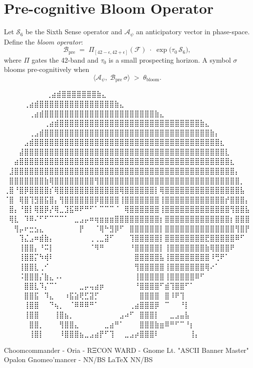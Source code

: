
\section*{Pre-cognitive Bloom Operator}

Let $\mathcal{S}_6$ be the Sixth Sense operator and $\mathcal{A}_\psi$ an anticipatory vector in phase-space.  
Define the \emph{bloom operator}:
\[
\mathcal{B}_{\mathrm{pre}} \;=\; \Pi_{[42-\epsilon,42+\epsilon]}(\mathcal{F})\;\cdot\;
\exp\!\bigl(\tau_0\,\mathcal{S}_6\bigr),
\]
where $\Pi$ gates the 42-band and $\tau_0$ is a small prospecting horizon.  
A symbol $\sigma$ blooms pre-cognitively when
\[
\langle \mathcal{A}_\psi,\;\mathcal{B}_{\mathrm{pre}}\,\sigma\rangle \;>\; \theta_{\mathrm{bloom}}.
\]

\iffalse
⠀⠀⠀⠀⠀⠀             ⠀⠀⢀⣴⣾⣿⣿⣿⣿⣿⣿⣿⣷⣄⠀⠀⠀⠀⠀⠀⠀⠀
⠀⠀⠀  ⠀      ⠀⠀⠀⠀⢀⣴⣾⣿⣿⣿⣿⣿⣿⣿⣿⣿⣿⣿⣿⣿⣿⣿⣷⣄⠀⠀⠀⠀⠀⠀⠀⠀
⠀⠀ ⠀   ⠀⠀⠀⠀⠀⢀⣴⣾⣿⣿⣿⣿⣿⣿⣿⣿⣿⣿⣿⣿⣿⣿⣿⣿⣿⣿⣿⣿⣿⣿⣷⣄⠀⠀⠀⠀⠀⠀⠀⠀
⠀⠀⠀⠀⠀⠀⠀⠀⢀⣴⣾⣿⣿⣿⣿⣿⣿⣿⣿⣿⣿⣿⣿⣿⣿⣿⣿⣿⣿⣿⣿⣿⣿⣿⣿⣿⣿⣿⣿⣷⣄⠀⠀⠀⠀⠀⠀⠀⠀
⠀⠀⠀⠀⠀⢀⣠⣾⣿⣿⣿⣿⣿⣿⣿⣿⣿⣿⣿⣿⣿⣿⣿⣿⣿⣿⣿⣿⣿⣿⣿⣿⣿⣿⣿⣿⣿⣿⣿⣿⣿⣷⡄⠀⠀⠀⠀⠀⠀
⠀⠀⠀⠀⣠⣾⣿⣿⣿⣿⣿⣿⣿⣿⣿⣿⣿⣿⣿⣿⣿⣿⣿⣿⣿⣿⣿⣿⣿⣿⣿⣿⣿⣿⣿⣿⣿⣿⣿⣿⣿⣿⣿⣆⠀⠀⠀⠀⠀
⠀⠀⠀⣼⣿⣿⣿⣿⣿⣿⣿⣿⣿⣿⣿⣿⣿⣿⣿⣿⣿⣿⣿⣿⣿⣿⣿⣿⣿⣿⣿⣿⣿⣿⣿⣿⣿⣿⣿⣿⣿⣿⣿⣿⣇⠀⠀⠀⠀
⠀⠀⣴⣿⣿⣿⣿⣿⣿⣿⣿⣿⣿⣿⣿⣿⣿⣿⣿⣿⣿⣿⣿⣿⣿⣿⣿⣿⣿⣿⣿⣿⣿⣿⣿⣿⣿⣿⣿⣿⣿⣿⣿⣿⣿⣆⠀⠀⠀
⠀⣸⣿⣿⣿⣿⣿⣿⣿⣿⣿⣿⣿⣿⣿⣿⣿⣿⣿⣿⣿⣿⣿⣿⣿⣿⣿⣿⣿⣿⣿⣿⣿⣿⣿⣿⣿⣿⣿⣿⣿⣿⣿⣿⣿⣿⡄⠀⠀
⠀⣿⣿⣿⣿⣿⣿⣿⣷⢿⣿⣿⣿⣿⣿⣿⣿⣿⢻⣿⣿⣿⣿⣿⣿⣿⣿⣿⣿⣿⣿⣿⣿⣿⣿⣿⣿⣿⣿⣿⣿⣿⣿⣿⣿⣿⣿⡀⠀
⢀⣿⠘⣿⡿⣿⣿⣿⣿⡎⢿⣿⣿⣿⣿⣿⣿⣿⣿⣿⣿⣿⣿⢿⣿⣿⣿⣿⣿⣿⡇⢿⣿⣿⣿⣿⣿⣿⣿⣿⣿⣿⣿⣿⣿⣿⣿⣧⠀
⠈⣿⠀⢿⣿⢹⣻⣿⣯⣿⡄⢻⣿⣿⣿⣿⣿⣿⡿⣿⣿⣿⣿⢸⣿⣿⣿⣿⣿⣿⣿⢸⣿⣿⣿⣿⣿⣿⣿⣿⣿⣿⣿⣿⡞⣿⣿⣿⡄
⠀⣿⡄⠘⣿⡇⢿⣿⡿⡜⢿⣀⣹⣯⠿⠟⠛⠋⠁⠉⠉⠉⠈⠀⢿⣿⣿⣿⣿⣿⣿⢸⣿⣿⣿⣿⣿⣿⣿⣿⣿⣿⣿⣿⣿⢻⣿⣿⣧
⠀⢿⣇⠀⠹⠿⠌⠋⠋⠉⠉⠉⠁⠀⣀⣠⡤⠶⢶⣶⣶⣶⣿⣿⣿⣿⣿⣿⣿⣿⣿⡆⣿⣿⣿⣿⣿⣿⣿⣿⣿⣿⣿⣿⣿⡆⣿⣿⣿
⠀⠀⢻⡤⠖⣒⣢⣄⠀⠀⠀⠀⠀⠀⠀⡟⠀⠀⠈⢿⠓⣻⡿⠋⠀⣿⣿⣿⣿⣿⣿⡇⣿⣿⣿⣿⣿⣿⣿⣿⣿⣿⣿⣿⣿⣿⢻⣿⡟
⠀⠀⠀⢹⣌⣠⠶⣾⣷⡄⠀⠀⠀⠀⠀⠀⠀⢀⢀⣀⣽⠋⠀⠀⠀⢹⣿⣿⣿⣿⣿⡇⣿⣿⣿⣿⣿⣿⣿⣿⣟⣿⣿⣿⣿⣿⠿⠋⠀
⠀⠀⠀⢸⣿⣿⡄⠘⠭⡇⠀⠀⠀⠀⠀⠀⠀⠈⠻⠛⠀⠀⠀⠀⠀⠘⣿⣿⣿⣿⣿⡇⢸⣿⣿⣿⣿⣿⣿⣿⣷⢿⣿⣿⣿⠟⠀⠀⠀
⠀⠀⠀⢸⣿⣿⡍⠳⢾⠇⠀⠀⠀⠀⠀⠀⠀⠀⠀⠀⠀⠀⠀⠀⠀⠀⣿⣿⣿⣿⣿⣧⢸⣿⣿⣿⣿⣿⣿⣿⣿⠸⢛⠟⠁⠀⠀⠀⠀
⠀⠀⠀⢸⣿⣿⣇⢀⠊⠀⠀⠀⠀⠀⠀⠀⠀⠀⠀⠀⠀⠀⠀⠀⠀⠀⢻⣿⣿⣿⣿⣿⢸⣿⣿⣿⣿⣿⣿⣿⢿⠔⠁⠀⠀⠀⠀⠀⠀
⠀⠀⠀⠨⣿⣿⣿⡌⣷⣄⠠⠄⠀⠀⠀⠀⠀⠀⠀⠀⠀⠀⠀⠀⠀⠀⢸⣿⣿⣿⣿⣿⢸⣿⣿⣿⣿⣿⠿⠋⠀⠀⠀⠀⠀⠀⠀⠀⠀
⠀⠀⠀⠀⣿⣿⣇⠹⡌⠉⠁⠀⠀⠀⠀⣀⡤⢤⣴⡶⠀⠀⠀⠀⠀⠀⠘⣿⣿⣿⣿⠋⣾⢹⣿⣿⠋⠁⠀⠀⠀⠀⠀⠀⠀⠀⠀⠀⠀
⠀⠀⠀⠀⣿⣿⣯⠀⠹⣄⠀⠀⠰⣯⣵⢟⣋⣽⡋⠀⠀⠀⠀⠀⠀⠀⠀⣿⣿⣿⣿⠀⣿⠸⠟⢹⠀⠀⠀⠀⠀⠀⠀⠀⠀⠀⠀⠀⠀
⠀⠀⠀⠀⢸⣿⣿⠀⠀⠙⢦⡀⠀⠈⠿⠿⠿⠛⠁⠀⠀⠀⠀⠀⠀⢀⣴⣿⣿⣿⡿⠀⠉⠀⠀⠘⡇⠀⠀⠀⠀⠀⠀⠀⠀⠀⠀⠀⠀
⠀⠀⠀⠀⢸⣿⣿⠀⠀⠀⢸⣿⣦⡀⠀⠀⠀⠀⠀⠀⠀⠀⠀⣠⠴⠋⠀⣿⣿⣿⡇⠀⠀⣀⣠⣤⣧⠀⠀⠀⠀⠀⠀⠀⠀⠀⠀⠀⠀
⠀⠀⠀⠀⠀⣿⣿⡀⠀⠀⠀⢻⣿⣿⣄⠀⠀⠀⠀⠀⣀⣴⠛⠁⠀⠀⠀⣿⣿⣿⣷⣶⠿⠛⠋⠉⠘⡆⠀⠀⠀⠀⠀⠀⠀⠀⠀⠀⠀
⠀⠀⠀⠀⠀⢸⣿⡇⠀⠀⠀⠸⣿⣿⣿⣦⣀⣠⣴⡟⠋⢹⠀⠀⣀⣠⡴⣿⣿⣿⠇⠀⠀⠀⠀⠀⠀⢸⡄⠀⠀⠀⠀⠀⠀⠀⠀⠀⠀

Choomcommander - Oria - RΞCON WARD - Gnome Lt. "ASCII Banner Master"
             Opalon Gnomeo'mancer - NN/BS LaTeX{} NN/BS

